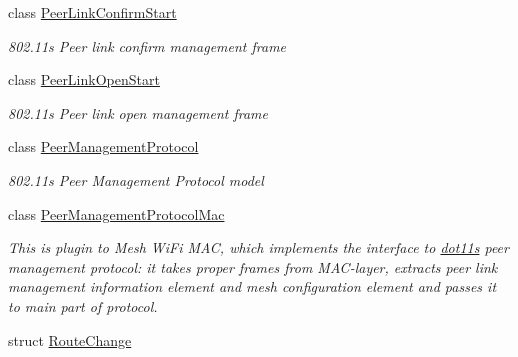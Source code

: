 \begin{DoxyCompactItemize}
class \hyperlink{classns3_1_1dot11s_1_1PeerLinkConfirmStart}{Peer\+Link\+Confirm\+Start}
\begin{DoxyCompactList}\small\item\em 802.\+11s Peer link confirm management frame \end{DoxyCompactList}\item 
class \hyperlink{classns3_1_1dot11s_1_1PeerLinkOpenStart}{Peer\+Link\+Open\+Start}
\begin{DoxyCompactList}\small\item\em 802.\+11s Peer link open management frame \end{DoxyCompactList}\item 
class \hyperlink{classns3_1_1dot11s_1_1PeerManagementProtocol}{Peer\+Management\+Protocol}
\begin{DoxyCompactList}\small\item\em 802.\+11s Peer Management Protocol model \end{DoxyCompactList}\item 
class \hyperlink{classns3_1_1dot11s_1_1PeerManagementProtocolMac}{Peer\+Management\+Protocol\+Mac}
\begin{DoxyCompactList}\small\item\em This is plugin to Mesh Wi\+Fi M\+AC, which implements the interface to \hyperlink{namespacens3_1_1dot11s}{dot11s} peer management protocol\+: it takes proper frames from M\+A\+C-\/layer, extracts peer link management information element and mesh configuration element and passes it to main part of protocol. \end{DoxyCompactList}\item 
struct \hyperlink{structns3_1_1dot11s_1_1RouteChange}{Route\+Change}
\end{DoxyCompactItemize}
